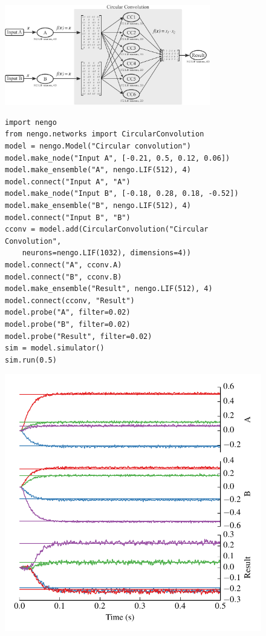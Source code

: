 \documentclass{frontiersSCNS}
\begin{document}
\begin{figure}
\begin{center}
  \includegraphics[width=0.8\textwidth]{cconv}
  \begin{minipage}{0.46\textwidth}
    \begin{lstlisting}[basicstyle={\footnotesize\ttfamily}]
import nengo
from nengo.networks import CircularConvolution
model = nengo.Model("Circular convolution")
model.make_node("Input A", [-0.21, 0.5, 0.12, 0.06])
model.make_ensemble("A", nengo.LIF(512), 4)
model.connect("Input A", "A")
model.make_node("Input B", [-0.18, 0.28, 0.18, -0.52])
model.make_ensemble("B", nengo.LIF(512), 4)
model.connect("Input B", "B")
cconv = model.add(CircularConvolution("Circular Convolution",
    neurons=nengo.LIF(1032), dimensions=4))
model.connect("A", cconv.A)
model.connect("B", cconv.B)
model.make_ensemble("Result", nengo.LIF(512), 4)
model.connect(cconv, "Result")
model.probe("A", filter=0.02)
model.probe("B", filter=0.02)
model.probe("Result", filter=0.02)
sim = model.simulator()
sim.run(0.5)
    \end{lstlisting}
  \end{minipage}
  \begin{minipage}{0.46\textwidth}
    \includegraphics[width=\textwidth]{cconv_res}

\end{minipage}
\end{center}
\end{figure}
\end{document}
